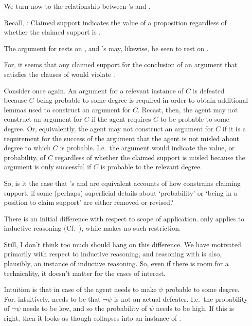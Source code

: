 \begin{note}[In relation to \nI{}]
  We turn now to the relationship between \citeauthor{Weisberg:2010to}'s \wnf{} and \nI{}.

  Recall, \eiS{}:
  Claimed support indicates the value of a proposition regardless of whether the claimed support is \mom{}.

  The argument for \nI{} rests on \eiS{}, and \citeauthor{Weisberg:2010to}'s \wnf{} may, likewise, be seen to rest on \eiS{}.

  For, it seems that any claimed support for the conclusion of an argument that satisfies the clauses of \wnf{} would violate \eiS{}.

  Consider \wnf{} once again.
  An argument for a relevant instance of \(C\) is defeated because \(C\) being probable to some degree is required in order to obtain additional lemmas used to construct an argument for \(C\).
  Recast, then, the agent may not construct an argument for \(C\) if the agent requires \(C\) to be probable to some degree.
  Or, equivalently, the agent may not construct an argument for \(C\) if it is a requirement for the success of the argument that the agent is not misled about degree to which \(C\) is probable.
  I.e.\ the argument would indicate the value, or probability, of \(C\) regardless of whether the claimed support is misled because the argument is only successful if \(C\) is probable to the relevant degree.

  So, is it the case that \citeauthor{Weisberg:2010to}'s \wnf{} and \nI{} are equivalent accounts of how \eiS{} constrains claiming support, if some (perhaps) superficial details about `probability' or `being in a position to claim support' are either removed or revised?
\end{note}

\begin{note}[Technicality]
  There is an initial difference with respect to scope of application.
  \wnf{} only applies to inductive reasoning (Cf.~\Citeyear[533]{Weisberg:2010to}), while \nI{} makes no such restriction.

  Still, I don't think too much should hang on this difference.
  We have motivated \nI{} primarily with respect to inductive reasoning, and reasoning with \gsi{-} is also, plausibly, an instance of inductive reasoning.
  So, even if there is room for a technicality, it doesn't matter for the cases of interest.
\end{note}

\begin{note}
  \color{red}
  Intuition is that in case of \nI{} the agent needs to make \(\psi\) probable to some degree.
  For, intuitively, needs to be that \(\lnot\psi\) is not an actual defeater.
  I.e.\ the probability of \(\lnot\psi\) needs to be low, and so the probability of \(\psi\) needs to be high.
  If this is right, then it looks as though \nI{} collapses into an instance of \wnf{}.
\end{note}


